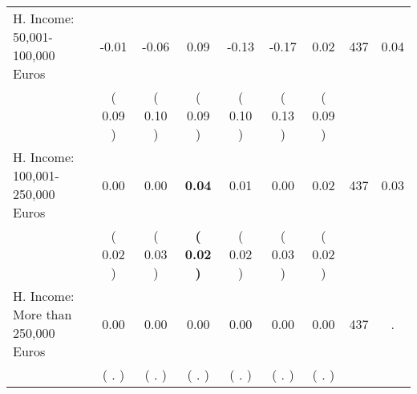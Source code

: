 \begin{tabular}{lcccccccc}
H. Income: 50,001-100,000 Euros &     -0.01 &     -0.06 &      0.09 &     -0.13 &     -0.17 &      0.02 & 437 &       0.04 \\ 
 & (     0.09 ) & (     0.10 ) & (     0.09 ) & (     0.10 ) & (     0.13 ) & (     0.09 ) & \\
H. Income: 100,001-250,000 Euros &      0.00 &      0.00 & \textbf{     0.04} &      0.01 &      0.00 &      0.02 & 437 &       0.03 \\ 
 & (     0.02 ) & (     0.03 ) & \textbf{(     0.02 )} & (     0.02 ) & (     0.03 ) & (     0.02 ) & \\
H. Income: More than 250,000 Euros &      0.00 &      0.00 &      0.00 &      0.00 &      0.00 &      0.00 & 437 &          . \\ 
 & (        . ) & (        . ) & (        . ) & (        . ) & (        . ) & (        . ) & \\
\bottomrule
\end{tabular}

